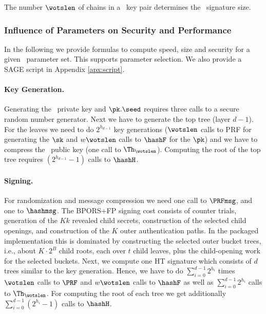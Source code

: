 The number $\wotslen$ of chains in a \WOTSCS\ key pair determines the \WOTSCS\ signature size.

\subsubsection{Influence of Parameters on Security and Performance} \label{sec:securityandperformance}

In the following we provide formulas to compute speed, size and security for a given \SPHINCSA\ parameter set. This supports parameter selection. We also provide a SAGE script in Appendix \ref{apx:script}.
 

\paragraph{Key Generation.} 
Generating the \SPHINCSA\ private key and $\pk.\seed$ requires three calls to a secure random number generator. Next we have to generate the top tree (layer $d-1$). For the leaves we need to do $2^{h_{d-1}}$ \WOTSCS key generations ($\wotslen$ calls to PRF for generating the $\sk$ and $w \wotslen$ calls to $\hashF$ for the $\pk$) and we have to compress the \WOTSCS\ public key (one call to $\Th_{\wotslen}$). Computing the root of the top tree requires $(2^{h_{d-1}}-1)$ calls to $\hashH$.

\paragraph{Signing.}
For randomization and message compression we need one call to $\PRFmsg$, and
one to $\hashmsg$.  The BPORS+FP signing cost consists of counter trials,
generation of the $Kk$ revealed child secrets, construction of the selected
child openings, and construction of the $K$ outer authentication paths.  In the
packaged implementation this is dominated by constructing the selected outer
bucket trees, i.e., about $K\cdot 2^B$ child roots, each over $t$ child leaves,
plus the child-opening work for the selected buckets.  Next, we compute one HT
signature which consists of $d$ trees similar to the key generation. Hence, we
have to do $\sum_{i=0}^{d-1} 2^{h_i}$ times $\wotslen$ calls to $\PRF$ and
$w \wotslen$ calls to $\hashF$ as well as $\sum_{i=0}^{d-1} 2^{h_i}$ calls to
$\Th_{\wotslen}$. For computing the root of each tree we get additionally
$\sum_{i=0}^{d-1} (2^{h_i}-1)$ calls to $\hashH$.

